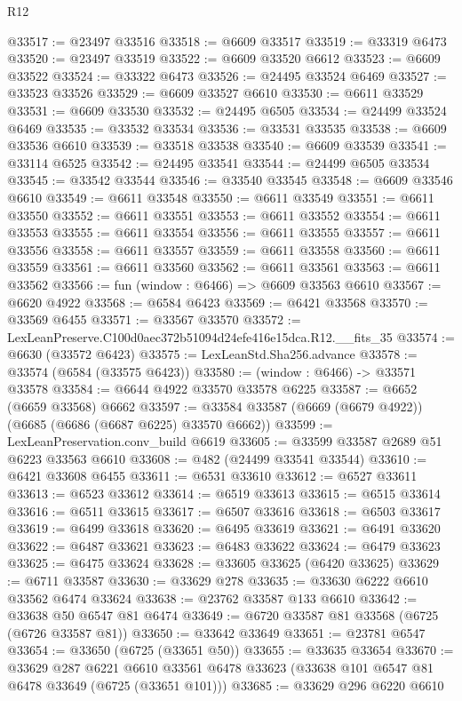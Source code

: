 \begin{lexlean}{R12}
\begin{coremodule}
@33517 := @23497 @33516
@33518 := @6609 @33517
@33519 := @33319 @6473
@33520 := @23497 @33519
@33522 := @6609 @33520 @6612
@33523 := @6609 @33522
@33524 := @33322 @6473
@33526 := @24495 @33524 @6469
@33527 := @33523 @33526
@33529 := @6609 @33527 @6610
@33530 := @6611 @33529
@33531 := @6609 @33530
@33532 := @24495 @6505
@33534 := @24499 @33524 @6469
@33535 := @33532 @33534
@33536 := @33531 @33535
@33538 := @6609 @33536 @6610
@33539 := @33518 @33538
@33540 := @6609 @33539
@33541 := @33114 @6525
@33542 := @24495 @33541
@33544 := @24499 @6505 @33534
@33545 := @33542 @33544
@33546 := @33540 @33545
@33548 := @6609 @33546 @6610
@33549 := @6611 @33548
@33550 := @6611 @33549
@33551 := @6611 @33550
@33552 := @6611 @33551
@33553 := @6611 @33552
@33554 := @6611 @33553
@33555 := @6611 @33554
@33556 := @6611 @33555
@33557 := @6611 @33556
@33558 := @6611 @33557
@33559 := @6611 @33558
@33560 := @6611 @33559
@33561 := @6611 @33560
@33562 := @6611 @33561
@33563 := @6611 @33562
@33566 := fun (window : @6466) => @6609 @33563 @6610
@33567 := @6620 @4922
@33568 := @6584 @6423
@33569 := @6421 @33568
@33570 := @33569 @6455
@33571 := @33567 @33570
@33572 := LexLeanPreserve.C100d0aec372b51094d24efe416e15dca.R12.__fits_35
@33574 := @6630 (@33572 @6423)
@33575 := LexLeanStd.Sha256.advance
@33578 := @33574 (@6584 (@33575 @6423))
@33580 := (window : @6466) -> @33571 @33578
@33584 := @6644 @4922 @33570 @33578 @6225
@33587 := @6652 (@6659 @33568) @6662
@33597 := @33584 @33587 (@6669 (@6679 @4922)) (@6685 (@6686 (@6687 @6225) @33570 @6662))
@33599 := LexLeanPreservation.conv_build @6619
@33605 := @33599 @33587 @2689 @51 @6223 @33563 @6610
@33608 := @482 (@24499 @33541 @33544)
@33610 := @6421 @33608 @6455
@33611 := @6531 @33610
@33612 := @6527 @33611
@33613 := @6523 @33612
@33614 := @6519 @33613
@33615 := @6515 @33614
@33616 := @6511 @33615
@33617 := @6507 @33616
@33618 := @6503 @33617
@33619 := @6499 @33618
@33620 := @6495 @33619
@33621 := @6491 @33620
@33622 := @6487 @33621
@33623 := @6483 @33622
@33624 := @6479 @33623
@33625 := @6475 @33624
@33628 := @33605 @33625 (@6420 @33625)
@33629 := @6711 @33587
@33630 := @33629 @278
@33635 := @33630 @6222 @6610 @33562 @6474 @33624
@33638 := @23762 @33587 @133 @6610
@33642 := @33638 @50 @6547 @81 @6474
@33649 := @6720 @33587 @81 @33568 (@6725 (@6726 @33587 @81))
@33650 := @33642 @33649
@33651 := @23781 @6547
@33654 := @33650 (@6725 (@33651 @50))
@33655 := @33635 @33654
@33670 := @33629
    @287
    @6221
    @6610
    @33561
    @6478
    @33623
    (@33638 @101 @6547 @81 @6478 @33649 (@6725 (@33651 @101)))
@33685 := @33629
    @296
    @6220
    @6610

\end{coremodule}
\end{lexlean}
